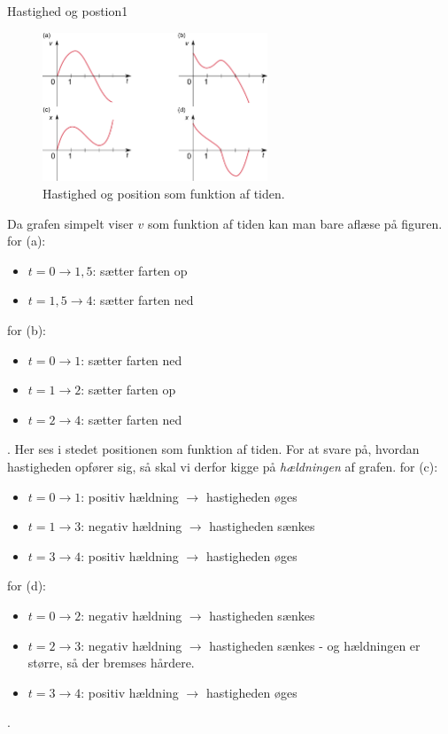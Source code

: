 \begin{opgave}{Hastighed og postion}{1}
\begin{figure}[h!]
  \centering
  \includegraphics[width=0.6\textwidth]{matematik/vx_grafer.png}
  \caption{Hastighed og position som funktion af tiden.}
  \label{fig:vx_grafer}
\end{figure}
\opg Da grafen simpelt viser $v$ som funktion af tiden kan man bare aflæse på figuren.
for (a): 
\begin{itemize}
\item $t= 0 \rightarrow 1,5$: sætter farten op
\item $t= 1,5 \rightarrow 4$: sætter farten ned
\end{itemize}
for (b):
\begin{itemize}
\item $t= 0 \rightarrow 1$: sætter farten ned
\item $t= 1 \rightarrow 2$: sætter farten op
\item $t= 2 \rightarrow 4$: sætter farten ned
\end{itemize}
.
\opg Her ses i stedet positionen som funktion af tiden. For at svare på, hvordan hastigheden opfører sig, så skal vi derfor kigge på \emph{hældningen} af grafen.
for (c): 
\begin{itemize}
\item $t= 0 \rightarrow 1$: positiv hældning $\rightarrow$ hastigheden øges
\item $t= 1 \rightarrow 3$: negativ hældning $\rightarrow$ hastigheden sænkes
\item $t= 3 \rightarrow 4$: positiv hældning $\rightarrow$ hastigheden øges
\end{itemize}
for (d):
\begin{itemize}
\item $t= 0 \rightarrow 2$: negativ hældning $\rightarrow$ hastigheden sænkes
\item $t= 2 \rightarrow 3$: negativ hældning $\rightarrow$ hastigheden sænkes - og hældningen er større, så der bremses hårdere.
\item $t= 3 \rightarrow 4$: positiv hældning $\rightarrow$ hastigheden øges
\end{itemize}
.
\end{opgave}
